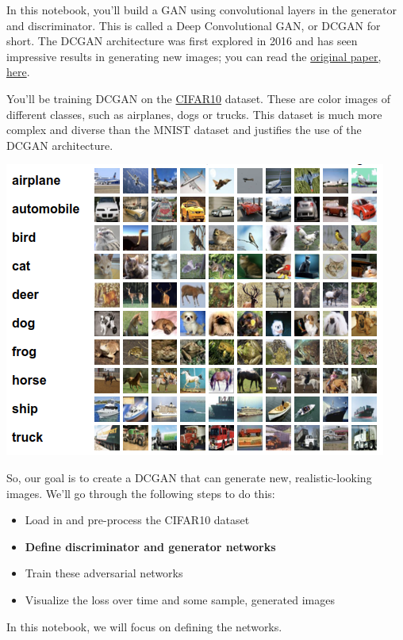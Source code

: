 In this notebook, you'll build a GAN using convolutional layers in the
generator and discriminator. This is called a Deep Convolutional GAN, or
DCGAN for short. The DCGAN architecture was first explored in 2016 and
has seen impressive results in generating new images; you can read the
\href{https://arxiv.org/pdf/1511.06434.pdf}{original paper, here}. \newline

You'll be training DCGAN on the
\href{https://www.cs.toronto.edu/~kriz/cifar.html}{CIFAR10} dataset.
These are color images of different classes, such as airplanes, dogs or
trucks. This dataset is much more complex and diverse than the MNIST
dataset and justifies the use of the DCGAN architecture.

\includegraphics[width=1\linewidth]{img//genAdvNet//deepGAN/cifar10_data.png}

So, our goal is to create a DCGAN that can generate new,
realistic-looking images. We'll go through the following steps to do
this: 
\begin{itemize}
    \item Load in and pre-process the CIFAR10 dataset
    \item \textbf{Define discriminator and generator networks}
    \item Train these adversarial networks
    \item Visualize the loss over time and some sample, generated images
\end{itemize}

In this notebook, we will focus on defining the networks.

